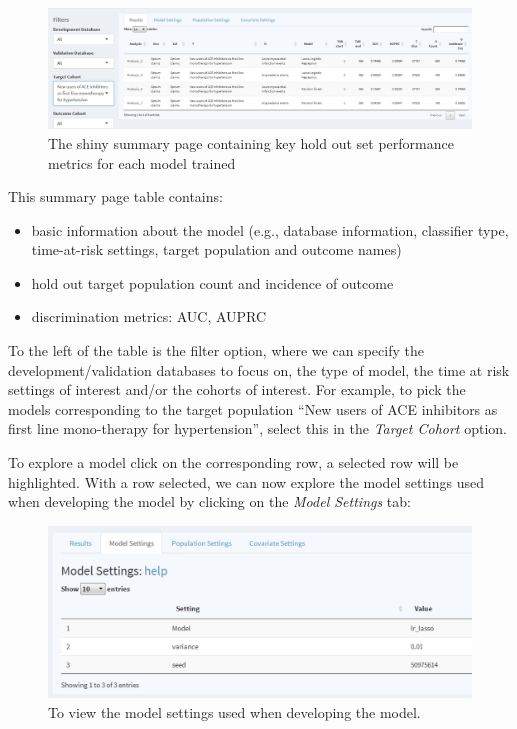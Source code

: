 \documentclass[11pt]{book}
\providecommand{\tightlist}{%
  \setlength{\itemsep}{0pt}\setlength{\parskip}{0pt}}
\theoremstyle{definition}
\theoremstyle{definition}
\theoremstyle{definition}
\theoremstyle{remark}
\begin{document}
\begin{figure}

{\centering \includegraphics[width=1\linewidth]{images/PatientLevelPrediction/shiny/shinyFilter} 

}

\caption{The shiny summary page containing key hold out set performance metrics for each model trained}\label{fig:multiShinySummary}
\end{figure}

This summary page table contains:

\begin{itemize}
\tightlist
\item
  basic information about the model (e.g., database information, classifier type, time-at-risk settings, target population and outcome names)
\item
  hold out target population count and incidence of outcome
\item
  discrimination metrics: AUC, AUPRC
\end{itemize}

To the left of the table is the filter option, where we can specify the development/validation databases to focus on, the type of model, the time at risk settings of interest and/or the cohorts of interest. For example, to pick the models corresponding to the target population ``New users of ACE inhibitors as first line mono-therapy for hypertension'', select this in the \emph{Target Cohort} option.

To explore a model click on the corresponding row, a selected row will be highlighted. With a row selected, we can now explore the model settings used when developing the model by clicking on the \emph{Model Settings} tab:

\begin{figure}

{\centering \includegraphics[width=1\linewidth]{images/PatientLevelPrediction/shiny/shinyModel} 

}

\caption{To view the model settings used when developing the model.}\label{fig:shinyModel}
\end{figure}
\end{document}
